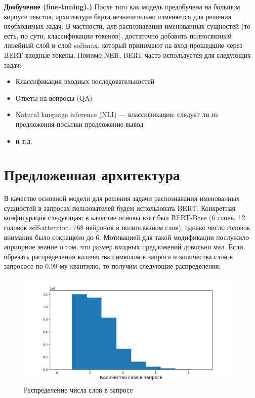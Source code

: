 \documentclass[12pt,a4paper]{article}
\begin{document}
\textbf{Дообучение (fine-tuning).)} После того как модель предобучена на большом корпусе текстов, архитектура берта незначительно изменяется для решения необходимых задач. В частности, для распознавания именованных сущностей (то есть, по сути, классификации токенов), достаточно добавить полносвязный линейный слой и слой softmax, который принимают на вход прошедшие через BERT входные токены. Помимо NER, BERT часто используется для следующих задач:
\begin{itemize}
    \item Классификация входных последовательностей
    \item Ответы на вопросы (QA)
    \item Natural language inference (NLI) --- классификация: следует ли из предложения-посылки предложение-вывод
    \item и т.д.
\end{itemize}

\section{Предложенная архитектура}

В качестве основной модели для решения задачи распознавания именованных сущностей в запросах пользователей будем использовать BERT. Конкретная конфигурация следующая: в качестве основы взят был BERT-Base (6 слоев, 12 головок self-attention, 768 нейронов в полносвязном слое), однако число головок внимания было сокращено до 6. Мотивацией для такой модификации послужило априорное знание о том, что размер входных предложений довольно мал. Если обрезать распределения количества символов в запроса и количества слов в запрососе по 0.99-му квантилю, то получим следующие распределения:

\begin{figure}[H]
	\begin{center}
		\includegraphics[scale=0.4]{nwords.pdf}
	\end{center}
	\caption{Распределение числа слов в запросе}
\end{figure}
\end{document}
